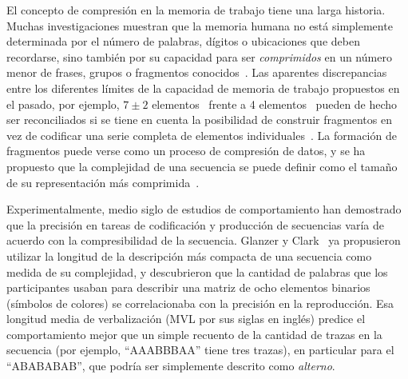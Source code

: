 El concepto de compresión en la memoria de trabajo tiene una larga historia. Muchas investigaciones muestran que la memoria humana no está simplemente determinada por el número de palabras, dígitos o ubicaciones que deben recordarse, sino también por su capacidad para ser \textit{comprimidos} en un número menor de frases, grupos o fragmentos conocidos~\cite{f23,f24,f25,f26,feldman2000minimization,f28,f29}. Las aparentes discrepancias entre los diferentes límites de la capacidad de memoria de trabajo propuestos en el pasado, por ejemplo, $7\pm 2$ elementos~\cite{f29} frente a 4 elementos~\cite{f25,f30} pueden de hecho ser reconciliados si se tiene en cuenta la posibilidad de construir fragmentos en vez de codificar una serie completa de elementos individuales~\cite{f16,f31}. La formación de fragmentos puede verse como un proceso de compresión de datos, y se ha propuesto que la complejidad de una secuencia se puede definir como el tamaño de su representación más comprimida~\cite{f16,f32,f33,f34}.


Experimentalmente, medio siglo de estudios de comportamiento han demostrado que la precisión en tareas de codificación y producción de secuencias varía de acuerdo con la compresibilidad de la secuencia. Glanzer y Clark~\cite{f35} ya propusieron utilizar la longitud de la descripción más compacta de una secuencia como medida de su complejidad, y descubrieron que la cantidad de palabras que los participantes usaban para describir una matriz de ocho elementos binarios (símbolos de colores) se correlacionaba con la precisión en la reproducción. Esa longitud media de verbalización (MVL por sus siglas en inglés) predice el comportamiento mejor que un simple recuento de la cantidad de trazas en la secuencia (por ejemplo, ``AAABBBAA'' tiene tres trazas), en particular para el ``ABABABAB'', que podría ser simplemente descrito como \textit{alterno}.

